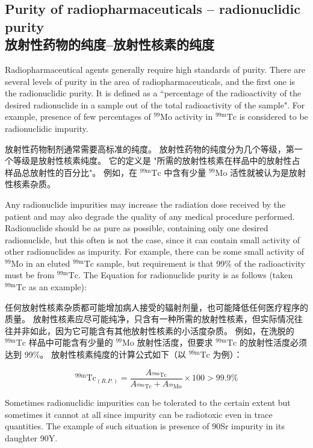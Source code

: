 \documentclass[dvipsnames, svgnames,a4paper,11pt]{article}
\begin{document}
\subsection{Purity of radiopharmaceuticals – radionuclidic purity \\放射性药物的纯度--放射性核素的纯度}

Radiopharmaceutical agents generally require high standards of purity. There are
several levels of purity in the area of radiopharmaceuticals, and the first one is the
radionuclidic purity. It is defined as a “percentage of the radioactivity of the desired
radionuclide in a sample out of the total radioactivity of the sample". For example,
presence of few percentages of ${}^{99}\mathrm{Mo}$ activity in ${}^\mathrm{99m}\mathrm{Tc}$ is considered to be
radionuclidic impurity.

放射性药物制剂通常需要高标准的纯度。 放射性药物的纯度分为几个等级，第一个等级是放射性核素纯度。 它的定义是 "所需的放射性核素在样品中的放射性占样品总放射性的百分比"。 例如，在 ${}^\mathrm{99m}\mathrm{Tc}$ 中含有少量 ${}^{99}\mathrm{Mo}$ 活性就被认为是放射性核素杂质。

Any radionuclide impurities may increase the radiation dose received by the patient
and may also degrade the quality of any medical procedure performed. Radionuclide
should be as pure as possible, containing only one desired radionuclide, but this
often is not the case, since it can contain small activity of other radionuclides as
impurity. For example, there can be some small activity of ${}^{99}\mathrm{Mo}$ in an eluted ${}^\mathrm{99m}\mathrm{Tc}$
sample, but requirement is that 99\% of the radioactivity must be from ${}^\mathrm{99m}\mathrm{Tc}$. The
Equation for radionuclide purity is as follows (taken ${}^\mathrm{99m}\mathrm{Tc}$ as an example):

任何放射性核素杂质都可能增加病人接受的辐射剂量，也可能降低任何医疗程序的质量。 放射性核素应尽可能纯净，只含有一种所需的放射性核素，但实际情况往往并非如此，因为它可能含有其他放射性核素的小活度杂质。 例如，在洗脱的 ${}^\mathrm{99m}\mathrm{Tc}$ 样品中可能含有少量的 ${}^{99}\mathrm{Mo}$ 放射性活度，但要求 ${}^\mathrm{99m}\mathrm{Tc}$ 的放射性活度必须达到 99\%。 放射性核素纯度的计算公式如下（以 ${}^\mathrm{99m}\mathrm{Tc}$ 为例）：

$${ }^{99 \mathrm{m} } \mathrm{Tc} _{(R . P .)}=\frac{A_{{ }^{99 \mathrm{m} } \mathrm{Tc}}}{A_{{ }^{99 \mathrm{m} } \mathrm{Tc}}+A_{{ }^{99} \mathrm{Mo}}} \times 100>99.9 \%$$

Sometimes radionuclidic impurities can be tolerated to the certain extent but
sometimes it cannot at all since impurity can be radiotoxic even in trace quantities.
The example of such situation is presence of 90Sr impurity in its daughter 90Y.
\end{document}
